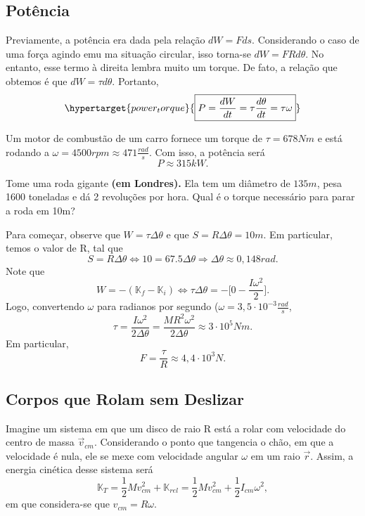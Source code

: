 \documentclass[physicsII_notes.tex]{subfiles}
\begin{document}
\subsection{Potência}
Previamente, a potência era dada pela relação \(dW = F ds.\) Considerando o caso de uma força agindo
emu ma situação circular, isso torna-se \(dW = FRd\theta \). No entanto, esse termo à direita lembra muito um torque. De fato,
a relação que obtemos é que \(dW = \tau d\theta \). Portanto,
\[
	\hypertarget{power_torque}{\boxed{P = \frac{dW}{dt} = \tau \frac{d\theta }{dt} = \tau \omega }}
\]
\begin{example}
	Um motor de combustão de um carro fornece um torque de \(\tau  = 678Nm\) e está rodando a \(\omega = 4500rpm \approx 471 \frac{rad}{s}\).
	Com isso, a potência será
	\[
		P\approx 315kW.
	\]
\end{example}
\begin{example}
	Tome uma roda gigante \textbf{(em Londres).} Ela tem um diâmetro de \(135m\), pesa 1600 toneladas e dá 2 revoluções por hora.
	Qual é o torque necessário para parar a roda em 10m?

	Para começar, observe que \(W = \tau \Delta \theta \) e que \(S = R\Delta \theta = 10m.\) Em particular, temos o valor de R, tal que
	\[
		S = R\Delta \theta \Longleftrightarrow 10 = 67.5\Delta \theta \Rightarrow \Delta \theta \approx 0,148rad.
	\]
	Note que
	\[
		W = -(\mathbb{K}_{f} - \mathbb{K}_{i}) \Longleftrightarrow \tau \Delta \theta = -\biggl[0 - \frac{I\omega^{2}}{2}\biggr].
	\]
	Logo, convertendo \(\omega \) para radianos por segundo (\(\omega = 3,5 \cdot 10^{-3}\frac{rad}{s}\),
	\[
		\tau = \frac{I\omega^{2}}{2\Delta \theta } = \frac{MR^{2}\omega^{2}}{2\Delta \theta } \approx 3 \cdot 10^{5}Nm.
	\]
	Em particular,
	\[
		F = \frac{\tau }{R}\approx 4,4 \cdot 10^{3}N.
	\]
\end{example}
\subsection{Corpos que Rolam sem Deslizar}
Imagine um sistema em que um disco de raio R está a rolar com velocidade do centro de massa \(\vec{v}_{cm}.\) Considerando o ponto que tangencia o chão, em que a velocidade é nula,
ele se mexe com velocidade angular \(\omega \) em um raio \(\vec{r}\). Assim, a energia cinética desse sistema será
\[
	\mathbb{K}_{T} = \frac{1}{2} Mv_{cm}^{2} + \mathbb{K}_{rel} = \frac{1}{2}Mv_{cm}^{2} + \frac{1}{2}I_{cm}\omega ^{2},
\]
em que considera-se que \(v_{cm} = R\omega.\)
\end{document}
